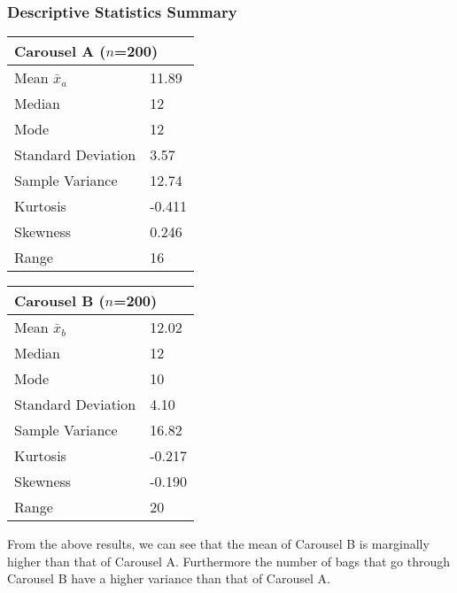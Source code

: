 \documentclass[11pt]{article}
\begin{document}
\subsubsection{Descriptive Statistics Summary}
\begin{table}[h]
\centering
\begin{tabular}{@{}lll@{}}
\toprule
\multicolumn{3}{l}{\textbf{Carousel A ($n$=200)}}         \\ \midrule
Mean $\bar{x}_a$                       & \multicolumn{2}{l}{11.89}  \\
Median                     & \multicolumn{2}{l}{12}     \\
Mode                       & \multicolumn{2}{l}{12}     \\
Standard Deviation         & \multicolumn{2}{l}{3.57}   \\
Sample Variance            & \multicolumn{2}{l}{12.74}  \\
Kurtosis                   & \multicolumn{2}{l}{-0.411} \\
Skewness                   & \multicolumn{2}{l}{0.246}  \\
Range                      & \multicolumn{2}{l}{16}     \\ \bottomrule
\end{tabular}
\qquad
\begin{tabular}{@{}lll@{}}
\toprule
\multicolumn{3}{l}{\textbf{Carousel B ($n$=200)}}         \\ \midrule
Mean $\bar{x}_b$                      & \multicolumn{2}{l}{12.02}  \\
Median                     & \multicolumn{2}{l}{12}     \\
Mode                       & \multicolumn{2}{l}{10}     \\
Standard Deviation         & \multicolumn{2}{l}{4.10}   \\
Sample Variance            & \multicolumn{2}{l}{16.82}  \\
Kurtosis                   & \multicolumn{2}{l}{-0.217} \\
Skewness                   & \multicolumn{2}{l}{-0.190} \\
Range                      & \multicolumn{2}{l}{20}     \\ \bottomrule
\end{tabular}
\end{table}
From the above results, we can see that the mean of Carousel B is marginally higher than that of Carousel A. Furthermore the number of bags that go through Carousel B have a higher variance than that of Carousel A. 
\newpage
\end{document}
